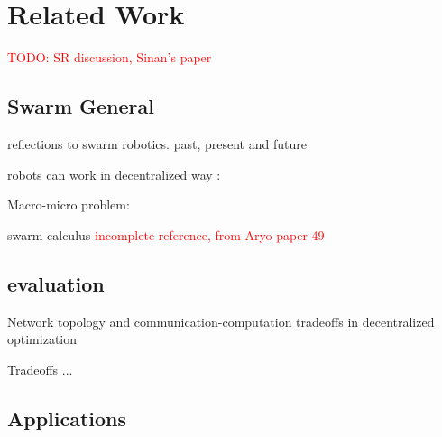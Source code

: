 \chapter{Related Work}
\label{ch2}


\textcolor{red}{TODO: SR discussion, Sinan's paper}

\section{Swarm General}

\cite{dorigo2014swarm}
\cite{dorigo2020reflections} reflections to swarm robotics.
\cite{dorigo2021swarm} past, present and future

robots can work in decentralized way :
\cite{dorigo2004evolving}
\cite{nouyan2009teamwork}
\cite{dorigo2013swarmanoid}
\cite{rubenstein2014programmable}
\cite{li2019decentralized}


Macro-micro problem:

\cite{hamann2008framework}
\cite{hamann2010space}
\cite{hamann2018swarm}
\cite{hamann2013towards} swarm calculus
\cite{valentini2015efficient} \textcolor{red}{incomplete reference, from Aryo paper 49}

\section{evaluation}

\cite{eberhardinger2018approach}
\cite{eberhardinger2018measuring}
\cite{kaddoum2010criteria}

\cite{nedic2018network} Network topology and communication-computation tradeoffs in decentralized optimization

\cite{jovanovic2016controller} Tradeoffs ...


\section{Applications}

